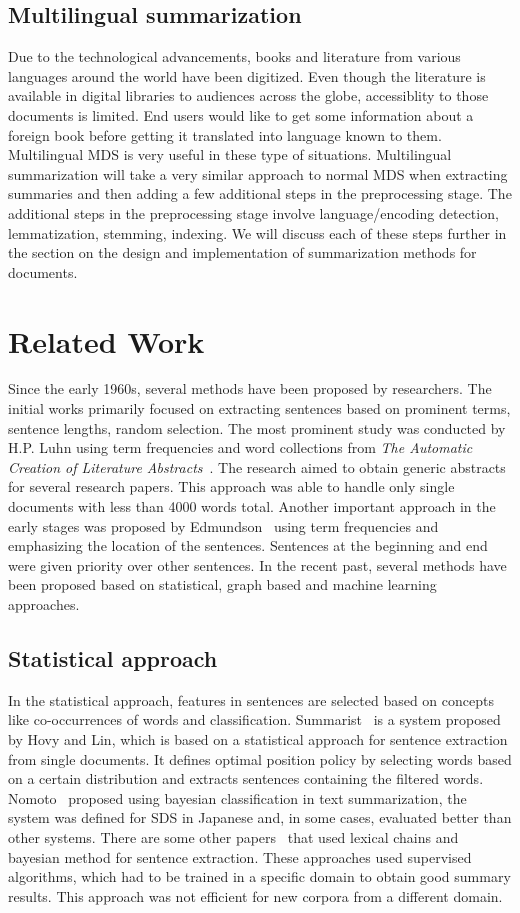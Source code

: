 \subsection{Multilingual summarization}
Due to the technological advancements, books and literature from various languages around the world have been digitized. Even though
the literature is available in digital libraries to audiences across the globe, accessiblity to those documents is limited.
End users would like to get some information about a foreign book before getting it translated into language known to them.
Multilingual MDS is very useful in these type of situations. Multilingual summarization will take a very similar approach to 
normal MDS when extracting summaries and then adding a few additional steps in the preprocessing stage. The additional steps in the preprocessing
stage involve language/encoding detection, lemmatization, stemming, indexing. We will discuss each of these steps further in 
the section on the design and implementation of summarization methods for documents.


\section{Related Work}
Since the early 1960s, several methods have been proposed by researchers. The initial works primarily focused on extracting
sentences based on prominent terms, sentence lengths, random selection. The most prominent study was 
conducted by H.P. Luhn using term frequencies and word collections from \textit{The Automatic Creation of Literature Abstracts}~\cite{Luhn:1958}.
The research aimed to obtain generic abstracts for several research papers. This approach was able to handle only single
documents with less than 4000 words total. Another important approach in the early stages was proposed by Edmundson~\cite{Edmundson:1969}
using term frequencies and emphasizing the location of the sentences. Sentences at the beginning and end were given
priority over other sentences. In the recent past, several methods have been proposed based on statistical, graph based and
machine learning approaches.
\subsection{Statistical approach}
In the statistical approach, features in sentences are selected based on concepts like co-occurrences of words and classification.
Summarist~\cite{Hovy99} is a system proposed by Hovy and Lin, which is based on a statistical approach for sentence extraction from single documents. 
It defines optimal position policy by selecting words based on a certain distribution and extracts sentences containing
the filtered words. Nomoto~\cite{Nomoto05} proposed using bayesian classification in text summarization, the system was
defined for SDS in Japanese and, in some cases, evaluated better than other systems. There are some other 
papers~\cite{Daume:2006} that used lexical chains and bayesian method for sentence extraction. These approaches used supervised
algorithms, which had to be trained in a specific domain to obtain good summary results. This approach was not efficient for
new corpora from a different domain.

